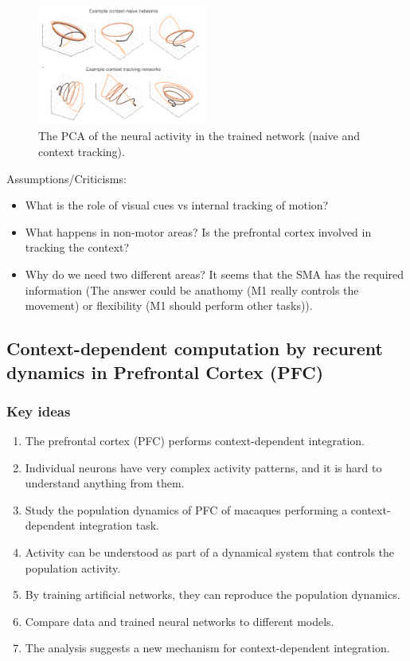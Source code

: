 \documentclass[11pt]{book} %
\begin{document}
\begin{figure}[h]
    \centering
    \includegraphics[width=0.5\textwidth]{./Figs/monkeyb4.jpeg}
    \caption{The PCA of the neural activity in the trained network (naive and context tracking).}
    \label{fig:entanglement_untangling}
\end{figure}

Assumptions/Criticisms:
\begin{itemize}
    \item What is the role of visual cues vs internal tracking of motion?
    \item What happens in non-motor areas? Is the prefrontal cortex involved in tracking the context?
    \item Why do we need two different areas? It seems that the SMA has the required information 
    (The answer could be anathomy (M1 really controls the movement) or flexibility (M1 should perform other tasks)).
\end{itemize}


\subsection{Context-dependent computation by recurent dynamics in Prefrontal Cortex (PFC)}

\subsubsection{Key ideas}

\begin{enumerate}
    \item The prefrontal cortex (PFC) performs context-dependent integration.
    \item Individual neurons have very complex activity patterns, and it is hard to understand anything from them.
    \item Study the population dynamics of PFC of macaques performing a context-dependent integration task.
    \item Activity can be understood as part of a dynamical system that controls the population activity.
    \item By training artificial networks, they can reproduce the population dynamics.
    \item Compare data and trained neural networks to different models.
    \item The analysis suggests a new mechanism for context-dependent integration.
\end{enumerate}
\end{document}
